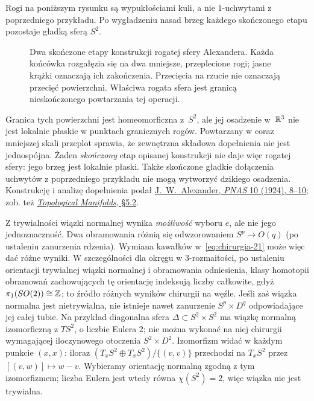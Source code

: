 \begin{uwaga}
Rogi na poniższym rysunku są wypukłościami kuli,
a nie $1$-uchwytami z poprzedniego przykładu.
Po wygładzeniu nasad brzeg każdego skończonego
etapu pozostaje gładką sferą $S^2$.

\begin{figure}[H]
\centering

\caption{Dwa skończone etapy konstrukcji rogatej sfery
Alexandera. Każda końcówka rozgałęzia się na dwa mniejsze,
przeplecione rogi; jasne krążki oznaczają ich zakończenia.
Przecięcia na rzucie nie oznaczają
przecięć powierzchni. Właściwa rogata sfera jest granicą
nieskończonego powtarzania tej operacji.}
\label{fig:rogata-sfera-alexandera-26}
\end{figure}

Granica tych powierzchni jest homeomorficzna z~$S^2$,
ale jej osadzenie w~$\mathbb{R}^3$ nie jest lokalnie płaskie
w punktach granicznych rogów. Powtarzany w coraz mniejszej
skali przeplot sprawia, że zewnętrzna składowa dopełnienia
nie jest jednospójna. Żaden \emph{skończony} etap
opisanej konstrukcji nie daje więc rogatej sfery:
jego brzeg jest lokalnie płaski. Także skończone
gładkie dołączenia uchwytów z poprzedniego przykładu
nie mogą wytworzyć dzikiego osadzenia.
Konstrukcję i analizę dopełnienia podał
\href{https://doi.org/10.1073/pnas.10.1.8}
{J.~W.~Alexander, \emph{PNAS} 10 (1924), 8--10};
zob. też \href{https://people.mpim-bonn.mpg.de/aruray/documents/top_manifolds.pdf}
{\emph{Topological Manifolds}, §5.2}.
\end{uwaga}

\begin{uwaga}
Z trywialności wiązki normalnej wynika \emph{możliwość}
wyboru $e$, ale nie jego jednoznaczność.
Dwa obramowania różnią się odwzorowaniem
$S^p\to O(q)$ (po ustaleniu zanurzenia rdzenia).
Wymiana kawałków w~\eqref{eq:chirurgia-21} może więc
dać różne wyniki. W szczególności dla okręgu
w $3$-rozmaitości, po ustaleniu orientacji trywialnej
wiązki normalnej i obramowania odniesienia, klasy homotopii
obramowań zachowujących tę orientację indeksują liczby
całkowite, gdyż $\pi_1(SO(2))\cong\mathbb{Z}$;
to źródło różnych wyników chirurgii na węźle.
Jeśli zaś wiązka normalna jest nietrywialna,
nie istnieje nawet zanurzenie $S^p\times D^q$
odpowiadające jej całej tubie.
Na przykład diagonalna sfera $\Delta\subset S^2\times S^2$
ma wiązkę normalną izomorficzną z $TS^2$,
o liczbie Eulera $2$; nie można wykonać na niej
chirurgii wymagającej iloczynowego otoczenia
$S^2\times D^2$.
Izomorfizm widać w każdym punkcie $(x,x)$: iloraz
$(T_xS^2\oplus T_xS^2)/\{(v,v)\}$ przechodzi na $T_xS^2$
przez $[(v,w)]\mapsto w-v$.
Wybieramy orientację normalną zgodną z tym izomorfizmem;
liczba Eulera jest wtedy równa $\chi(S^2)=2$, więc wiązka
nie jest trywialna.
\end{uwaga}

